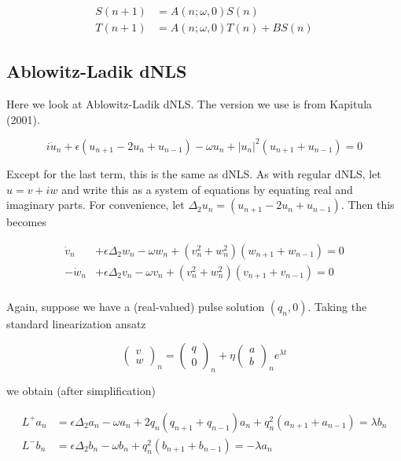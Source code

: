 \documentclass[12pt]{article}
\begin{document}
\begin{align*}
S(n+1) &= A(n; \omega, 0) S(n) \\
T(n+1) &= A(n; \omega, 0) T(n) + B S(n)
\end{align*}

\subsection{Ablowitz-Ladik dNLS}

Here we look at Ablowitz-Ladik dNLS. The version we use is from Kapitula (2001).

\begin{equation}
i\dot{u}_n + \epsilon(u_{n+1} - 2 u_n + u_{n-1}) - \omega u_n + |u_n|^2 (u_{n+1} + u_{n-1}) = 0
\end{equation}

Except for the last term, this is the same as dNLS. As with regular dNLS, let $u = v + i w$ and write this as a system of equations by equating real and imaginary parts. For convenience, let $\Delta_2 u_n = (u_{n+1} - 2 u_n + u_{n-1})$. Then this becomes

\begin{align*}
\dot{v}_n &+ \epsilon \Delta_2 w_n - \omega w_n + (v_n^2 + w_n^2)(w_{n+1} + w_{n-1}) = 0 \\
-\dot{w}_n &+ \epsilon \Delta_2 v_n - \omega v_n + (v_n^2 + w_n^2)(v_{n+1} + v_{n-1}) = 0 \\
\end{align*}

Again, suppose we have a (real-valued) pulse solution $(q_n, 0)$. Taking the standard linearization ansatz

\[
\begin{pmatrix}v \\ w\end{pmatrix}_n = 
\begin{pmatrix}q \\ 0\end{pmatrix}_n + 
\eta \begin{pmatrix}a \\ b\end{pmatrix}_n e^{\lambda t}
\]

we obtain (after simplification)

\begin{align*}
L^+ a_n &= \epsilon \Delta_2 a_n - \omega a_n 
+ 2q_n(q_{n+1} + q_{n-1})a_n + q_n^2 (a_{n+1} + a_{n-1}) = \lambda b_n \\
L^- b_n &= \epsilon \Delta_2 b_n - \omega b_n + q_n^2 (b_{n+1} + b_{n-1}) = -\lambda a_n
\end{align*}
\end{document}
